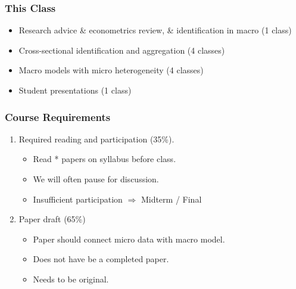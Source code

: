 \documentclass[english,xcolor=svgnames]{beamer}
\begin{document}
\begin{frame}
\frametitle[alignment=center]{This Class}
\begin{itemize}
	\item Research advice \& econometrics review, \& identification in macro  (1 class)
	\item Cross-sectional identification and aggregation (4 classes)
	\item Macro models with micro heterogeneity (4 classes)
	\item Student presentations (1 class)
\end{itemize}
\end{frame}


\begin{frame}
\frametitle[alignment=center]{Course Requirements}
\begin{enumerate}
	\item Required reading and participation (35\%).
	\begin{itemize}
		\item Read * papers on syllabus before class.
		\item We will often pause for discussion.
		\item Insufficient participation $\Rightarrow$ Midterm / Final
	\end{itemize}
	\item Paper draft (65\%)
	\begin{itemize}
		\item Paper should connect micro data with macro model.
		\item Does not have be a completed paper.
		\item Needs to be original. 
	\end{itemize}
\end{enumerate}
\end{frame}
\end{document}
